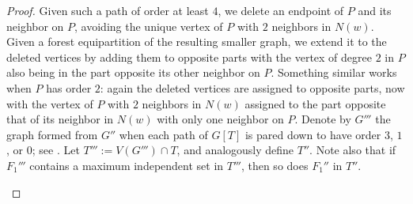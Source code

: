 \documentclass[11pt]{article}
\theoremstyle{definition}
\begin{document}
\begin{proof}
	Given such a path of order at least $4$, we delete an endpoint of $P$ and its neighbor on $P$, avoiding the unique vertex of $P$ with $2$ neighbors
	in $N(w)$.  Given a forest equipartition of the resulting smaller graph, we extend it to the deleted vertices by adding them to opposite parts
	with the vertex of degree $2$ in $P$ also being in the part opposite its other neighbor on $P$.  Something similar works when $P$ has order $2$: again
	the deleted vertices are assigned to opposite parts, now with the vertex of $P$ with $2$ neighbors in $N(w)$ assigned to the part opposite that of
	its neighbor in $N(w)$ with only one neighbor on $P$.  Denote by $G'''$ the graph formed from $G''$ when each path of $G[T]$ is pared down to have
	order $3$, $1$, or $0$; see .  Let $T''':=V(G''')\cap T$, and analogously define $T''$.
	Note also that if $F_1'''$ contains a maximum independent set in $T'''$, then so does $F_1''$ in $T''$.

    \begin{figure}[H]
        \centering
\end{figure}
\end{proof}
\end{document}
